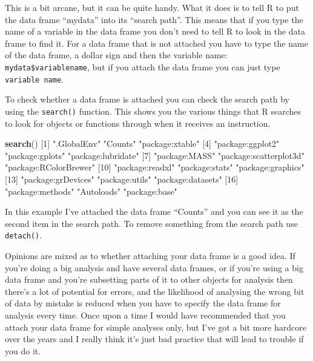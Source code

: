 \documentclass[
]{book}
\newenvironment{Shaded}{\begin{snugshade}}{\end{snugshade}}
\newcommand{\DecValTok}[1]{\textcolor[rgb]{0.00,0.00,0.81}{#1}}
\newcommand{\KeywordTok}[1]{\textcolor[rgb]{0.13,0.29,0.53}{\textbf{#1}}}
\newcommand{\NormalTok}[1]{#1}
\newcommand{\StringTok}[1]{\textcolor[rgb]{0.31,0.60,0.02}{#1}}
\begin{document}
This is a bit arcane, but it can be quite handy. What it does is to tell R to put the data frame ``mydata'' into its ``search path''. This means that if you type the name of a variable in the data frame you don't need to tell R to look in the data frame to find it. For a data frame that is not attached you have to type the name of the data frame, a dollar sign and then the variable name: \texttt{mydata\$variablename}, but if you attach the data frame you can just type \texttt{variable\ name}.

To check whether a data frame is attached you can check the search path by using the \texttt{search()} function. This shows you the various things that R searches to look for objects or functions through when it receives an instruction.

\begin{Shaded}
\begin{Highlighting}[]
\KeywordTok{search}\NormalTok{()}
\NormalTok{ [}\DecValTok{1}\NormalTok{] }\StringTok{".GlobalEnv"}            \StringTok{"Counts"}                \StringTok{"package:xtable"}       
\NormalTok{ [}\DecValTok{4}\NormalTok{] }\StringTok{"package:ggplot2"}       \StringTok{"package:gplots"}        \StringTok{"package:lubridate"}    
\NormalTok{ [}\DecValTok{7}\NormalTok{] }\StringTok{"package:MASS"}          \StringTok{"package:scatterplot3d"} \StringTok{"package:RColorBrewer"} 
\NormalTok{[}\DecValTok{10}\NormalTok{] }\StringTok{"package:readxl"}        \StringTok{"package:stats"}         \StringTok{"package:graphics"}     
\NormalTok{[}\DecValTok{13}\NormalTok{] }\StringTok{"package:grDevices"}     \StringTok{"package:utils"}         \StringTok{"package:datasets"}     
\NormalTok{[}\DecValTok{16}\NormalTok{] }\StringTok{"package:methods"}       \StringTok{"Autoloads"}             \StringTok{"package:base"}         
\end{Highlighting}
\end{Shaded}

In this example I've attached the data frame ``Counts'' and you can see it as the second item in the search path. To remove something from the search path use \texttt{detach()}.

Opinions are mixed as to whether attaching your data frame is a good idea. If you're doing a big analysis and have several data frames, or if you're using a big data frame and you're subsetting parts of it to other objects for analysis then there's a lot of potential for errors, and the likelihood of analysing the wrong bit of data by mistake is reduced when you have to specify the data frame for analysis every time. Once upon a time I would have recommended that you attach your data frame for simple analyses only, but I've got a bit more hardcore over the years and I really think it's just bad practice that will lead to trouble if you do it.
\end{document}
